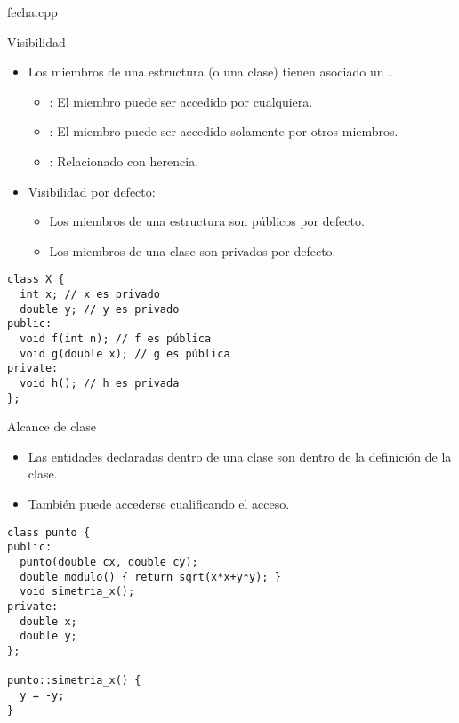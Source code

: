 \begin{frame}
\begin{block}{fecha.cpp}
\mode<presentation>{

}
\end{block}
\end{frame}

\begin{frame}[t,fragile]{Visibilidad}
\begin{itemize}
  \item Los miembros de una estructura (o una clase) tienen asociado 
        un .
    \begin{itemize}
      \item {}: El miembro puede ser accedido por cualquiera.
      \item {}: El miembro puede ser accedido solamente por otros miembros.
      \item {}: Relacionado con herencia.
    \end{itemize}
  \item Visibilidad por defecto:
    \begin{itemize}
      \item Los miembros de una estructura son públicos por defecto.
      \item Los miembros de una clase son privados por defecto.
    \end{itemize}
\end{itemize}
\vspace{-0.25cm}
\begin{lstlisting}
class X {
  int x; // x es privado
  double y; // y es privado
public:
  void f(int n); // f es pública
  void g(double x); // g es pública
private:
  void h(); // h es privada
};
\end{lstlisting}
\end{frame}

\begin{frame}[t,fragile]{Alcance de clase}
\begin{itemize}
  \item Las entidades declaradas dentro de una clase son 
         dentro de la definición de la clase.
  \item También puede accederse cualificando el acceso.
\end{itemize}
\begin{lstlisting}
class punto {
public:
  punto(double cx, double cy);
  double modulo() { return sqrt(x*x+y*y); }
  void simetria_x();
private:
  double x;
  double y;
};

punto::simetria_x() {
  y = -y;
}

\end{lstlisting}
\end{frame}

